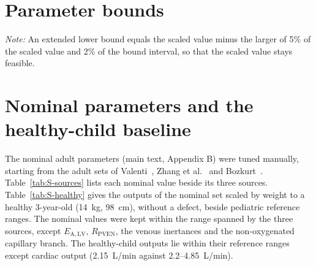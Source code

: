 \documentclass{article}
\begin{document}
\section{Parameter bounds}
\label{sec:S-bounds}
\begin{table}[H]
\centering\small
\setlength{\tabcolsep}{3pt}
\caption{Bounds of the seven calibrated parameters, with the scaled value, the clinical seed and the rule that sets each bound. The bounds were chosen by the authors.}
\label{tab:S-bounds}
\par\vspace{2pt}
{\footnotesize \emph{Note:} An extended lower bound equals the scaled value minus the larger of 5\% of the scaled value and 2\% of the bound interval, so that the scaled value stays feasible.}
\end{table}

\section{Nominal parameters and the healthy-child baseline}
\label{sec:S-baseline}
The nominal adult parameters (main text, Appendix B) were tuned manually, starting from the adult sets of Valenti~\cite{Valenti2023}, Zhang et al.~\cite{zhang2019multiscale} and Bozkurt~\cite{Bozkurt2019}. Table~\ref{tab:S-sources} lists each nominal value beside its three sources. Table~\ref{tab:S-healthy} gives the outputs of the nominal set scaled by weight to a healthy 3-year-old (14~kg, 98~cm), without a defect, beside pediatric reference ranges. The nominal values were kept within the range spanned by the three sources, except $E_{\mathrm{A,LV}}$, $R_{\mathrm{PVEN}}$, the venous inertances and the non-oxygenated capillary branch. The healthy-child outputs lie within their reference ranges except cardiac output (2.15~L/min against 2.2--4.85~L/min).
\end{document}
